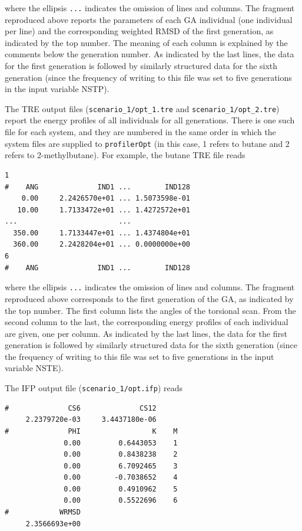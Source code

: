 \documentclass[10pt,a4paper,openany]{memoir}
\numberwithin{equation}{section}
\newcommand{\under}{\_}
\newcommand{\profileropt}[0]{\texttt{profilerOpt}}
\begin{document}
\noindent where the ellipsis \texttt{...} indicates the omission of
lines and columns.
%
The fragment reproduced above reports the parameters of each GA
individual (one individual per line) and the corresponding weighted
RMSD of the first generation, as indicated by the top number.
%
The meaning of each column is explained by the comments below the
generation number.
%
As indicated by the last lines, the data for the first generation is
followed by similarly structured data for the sixth generation (since
the frequency of writing to this file was set to five generations in
the input variable NSTP).
%

The TRE output files (\texttt{scenario\under{}1/opt\under{}1.tre} and
\texttt{scenario\under{}1/opt\under{}2.tre}) report the energy
profiles of all individuals for all generations.
%
There is one such file for each system, and they are numbered in the
same order in which the system files are supplied to \profileropt{}
(in this case, 1 refers to butane and 2 refers to 2-methylbutane).
%
For example, the butane TRE file reads

\begin{lstlisting}
1    
#    ANG              IND1 ...        IND128
    0.00     2.2426570e+01 ... 1.5073598e-01
   10.00     1.7133472e+01 ... 1.4272572e+01
...                        ...
  350.00     1.7133447e+01 ... 1.4374804e+01
  360.00     2.2428204e+01 ... 0.0000000e+00
6
#    ANG              IND1 ...        IND128  
\end{lstlisting}\vspace{1ex}\par

\noindent where the ellipsis \texttt{...} indicates the omission of lines and
columns.
%
The fragment reproduced above corresponds to the first generation of
the GA, as indicated by the top number.
%
The first column lists the angles of the torsional scan.
%
From the second column to the last, the corresponding energy profiles
of each individual are given, one per column.
%
As indicated by the last lines, the data for the first generation is
followed by similarly structured data for the sixth generation (since
the frequency of writing to this file was set to five generations in
the input variable NSTE).

The IFP output file (\texttt{scenario\under{}1/opt.ifp}) reads

\begin{lstlisting}
#              CS6              CS12
     2.2379720e-03     3.4437180e-06
#              PHI                 K    M
              0.00         0.6443053    1
              0.00         0.8438238    2
              0.00         6.7092465    3
              0.00        -0.7038652    4
              0.00         0.4910962    5
              0.00         0.5522696    6
#            WRMSD
     2.3566693e+00
\end{lstlisting}\vspace{1ex}\par
\end{document}

